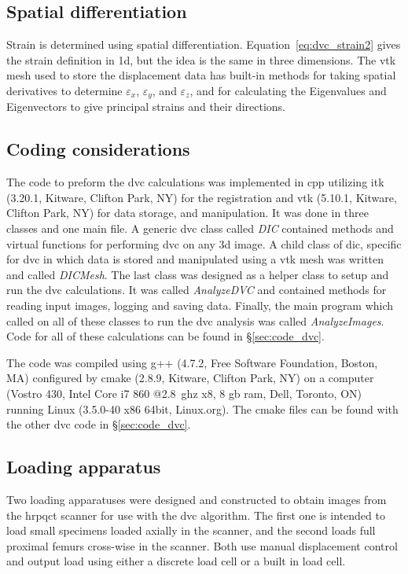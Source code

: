 \subsection{Spatial differentiation}
\label{sec:dvc_implement_differentiation}
Strain is determined using spatial differentiation.
Equation~\ref{eq:dvc_strain2} gives the strain definition in \acs{1d}, but the idea is the same in three dimensions.
The \ac{vtk} mesh used to store the displacement data has built-in methods for taking spatial derivatives to determine $\varepsilon_x$, $\varepsilon_y$, and $\varepsilon_z$, and for calculating the Eigenvalues and Eigenvectors to give principal strains and their directions.

\subsection{Coding considerations}
\label{sec:dvc_implement_code}
The code to preform the \ac{dvc} calculations was implemented in \ac{cpp} utilizing \ac{itk} (3.20.1, Kitware, Clifton Park, NY) for the registration and \ac{vtk} (5.10.1, Kitware, Clifton Park, NY) for data storage, and manipulation.
It was done in three classes and one main file.
A generic \ac{dvc} class called \textit{DIC} contained methods and virtual functions for performing \ac{dvc} on any \ac{3d} image.
A child class of \ac{dic}, specific for \ac{dvc} in which data is stored and manipulated using a \ac{vtk} mesh was written and called \textit{DICMesh}.
The last class was designed as a helper class to setup and run the \ac{dvc} calculations.
It was called \textit{AnalyzeDVC} and contained methods for reading input images, logging and saving data.
Finally, the main program which called on all of these classes to run the \ac{dvc} analysis was called \textit{AnalyzeImages}.
Code for all of these calculations can be found in \S\ref{sec:code_dvc}.

The code was compiled using g++ (4.7.2, Free Software Foundation, Boston, MA) configured by cmake (2.8.9, Kitware, Clifton Park, NY) on a computer (Vostro 430, Intel Core i7 860 @2.8~\acs{ghz} x8, 8 \acs{gb} \acs{ram}, Dell, Toronto, ON) running Linux (3.5.0-40 x86 64bit, Linux.org). The cmake files can be found with the other \ac{dvc} code in \S\ref{sec:code_dvc}.

\subsection{Loading apparatus}
\label{sec:dvc_apparatus}
Two loading apparatuses were designed and constructed to obtain images from the \ac{hrpqct} scanner for use with the \ac{dvc} algorithm.
The first one is intended to load small specimens loaded axially in the scanner, and the second loads full proximal femurs cross-wise in the scanner.
Both use manual displacement control and output load using either a discrete load cell or a built in load cell.

